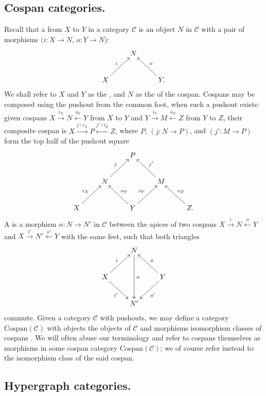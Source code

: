 \subsection{Cospan categories.}
Recall that a  from $X$ to $Y$ in a category $\mathcal C$ is an
object $N$ in $\mathcal C$ with a pair of morphisms $(i\colon  X \to N$, $o\colon  Y \to
N$):
\[
  \xymatrix{
    & N \\
    X \ar[ur]^{i} && Y. \ar[ul]_{o}
  }
\]
We shall refer to $X$ and $Y$ as the , and $N$ as the
 of the cospan.  Cospans may be composed using the pushout from
the common foot, when such a pushout exists: given cospans $X
\stackrel{i_X}{\longrightarrow} N \stackrel{o_Y}{\longleftarrow} Y$ from $X$ to
$Y$ and $Y \stackrel{i_Y}{\longrightarrow} M \stackrel{o_Z}{\longleftarrow} Z$
from $Y$ to $Z$, their composite cospan is $X \stackrel{j \circ
i_X}{\longrightarrow} P \stackrel{j'\circ i_Z}{\longleftarrow} Z$, where $P$,
$(j\colon  N \to P)$, and $(j'\colon  M \to P)$ form the top half of the pushout square
\[
  \xymatrix{
    && P \\
    & N \ar[ur]^j && M \ar[ul]_{j'} \\
    X \ar[ur]^{i_X} && Y \ar[ul]_{o_Y} \ar[ur]^{i_Y} && Z. \ar[ul]_{o_Z}
  }
\]
A  is a morphism $n\colon  N \to N'$ in $\mathcal C$ between
the apices of two cospans $X \stackrel{i}{\longrightarrow} N
\stackrel{o}{\longleftarrow} Y$ and $X \stackrel{i'}{\longrightarrow} N'
\stackrel{o'}{\longleftarrow} Y$ with the same feet, such that both triangles 
\[
  \xymatrix{
    & N \ar[dd]^n  \\
    X \ar[ur]^{i} \ar[dr]_{i'} && Y \ar[ul]_{o} \ar[dl]^{o'}\\
    & N'
  }
\]
commute. Given a category $\mathcal C$ with pushouts, we may define a category
$\mathrm{Cospan}(\mathcal C)$ with objects the objects of $\mathcal C$ and
morphisms isomorphism classes of cospans \cite{Be}. We will often abuse our
terminology and refer to cospans themselves as morphisms in some cospan
category $\mathrm{Cospan}(\mathcal C)$; we of course refer instead to the
isomorphism class of the said cospan.

\subsection{Hypergraph categories.}

